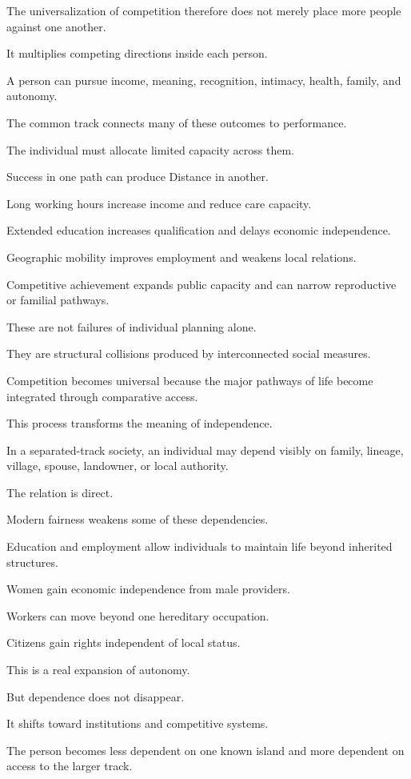 The universalization of competition therefore does not merely place more people against one another.

It multiplies competing directions inside each person.

A person can pursue income, meaning, recognition, intimacy, health, family, and autonomy.

The common track connects many of these outcomes to performance.

The individual must allocate limited capacity across them.

Success in one path can produce Distance in another.

Long working hours increase income and reduce care capacity.

Extended education increases qualification and delays economic independence.

Geographic mobility improves employment and weakens local relations.

Competitive achievement expands public capacity and can narrow reproductive or familial pathways.

These are not failures of individual planning alone.

They are structural collisions produced by interconnected social measures.

Competition becomes universal because the major pathways of life become integrated through comparative access.

This process transforms the meaning of independence.

In a separated-track society, an individual may depend visibly on family, lineage, village, spouse, landowner, or local authority.

The relation is direct.

Modern fairness weakens some of these dependencies.

Education and employment allow individuals to maintain life beyond inherited structures.

Women gain economic independence from male providers.

Workers can move beyond one hereditary occupation.

Citizens gain rights independent of local status.

This is a real expansion of autonomy.

But dependence does not disappear.

It shifts toward institutions and competitive systems.

The person becomes less dependent on one known island and more dependent on access to the larger track.

